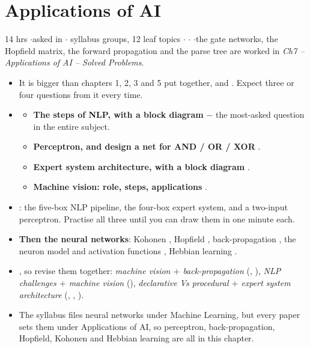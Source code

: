 \section{Applications of AI}

{\color{sub}\footnotesize 14 hrs \gap$\cdot$\gap asked in 
\gap$\cdot$ syllabus groups, 12 leaf topics \gap$\cdot$\gap {} \gap$\cdot$\gap {} \gap$\cdot$\gap the gate networks,
the Hopfield matrix, the forward propagation and the parse tree are worked in
\emph{Ch7 -- Applications of AI -- Solved Problems}.}

\begin{itemize}
  \item {} It is bigger
        than chapters 1, 2, 3 and 5 put together, and . Expect three or four questions from it every time.
  \item {}
  \begin{itemize}
    \item \textbf{The steps of NLP, with a block diagram}  $-$ the
          most-asked question in the entire subject.
    \item \textbf{Perceptron, and design a net for AND / OR / XOR} .
    \item \textbf{Expert system architecture, with a block diagram} .
    \item \textbf{Machine vision: role, steps, applications} .
  \end{itemize}
  \item {}:
        the five-box NLP pipeline, the four-box expert system, and a two-input
        perceptron. Practise all three until you can draw them in one minute each.
  \item \textbf{Then the neural networks}: Kohonen , Hopfield ,
        back-propagation , the neuron model and activation functions ,
        Hebbian learning .
  \item {}, so revise them
        together: \emph{machine vision $+$ back-propagation} (,
        ), \emph{NLP challenges $+$ machine vision}
        (), \emph{declarative Vs procedural $+$ expert
        system architecture} (, , ).
  \item {}
        The syllabus files neural networks under Machine Learning, but every paper
        sets them under Applications of AI, so perceptron, back-propagation, Hopfield,
        Kohonen and Hebbian learning are all in this chapter.
\end{itemize}

